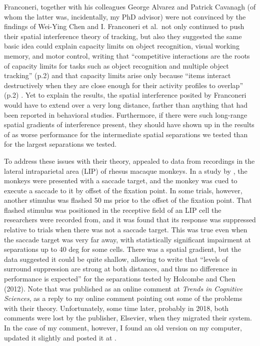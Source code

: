\documentclass[
]{book}
\begin{document}
Franconeri, together with his colleagues George Alvarez and Patrick Cavanagh (of whom the latter was, incidentally, my PhD advisor) were not convinced by the findings of Wei-Ying Chen and I. Franconeri et al.~not only continued to push their spatial interference theory of tracking, but also they suggested the same basic idea could explain capacity limits on object recognition, visual working memory, and motor control, writing that ``competitive interactions are the roots of capacity limits for tasks such as object recognition and multiple object tracking'' (p.2) and that capacity limits arise only because ``items interact destructively when they are close enough for their activity profiles to overlap'' (p.2) \citet{franconeriFlexibleCognitiveResources2013}. Yet to explain the \citet{holcombeExhaustingAttentionalTracking2012} results, the spatial interference posited by Franconeri would have to extend over a very long distance, farther than anything that had been reported in behavioral studies. Furthermore, if there were such long-range spatial gradients of interference present, they should have shown up in the results of \citet{holcombeExhaustingAttentionalTracking2012} as worse performance for the intermediate spatial separations we tested than for the largest separations we tested.

To address these issues with their theory, \citet{franconeriResourceTheoryNot2013} appealed to data from recordings in the lateral intraparietal area (LIP) of rhesus macaque monkeys. In a study by \citet{falknerSurroundSuppressionSharpens2010}, the monkeys were presented with a saccade target, and the monkey was cued to execute a saccade to it by offset of the fixation point. In some trials, however, another stimulus was flashed 50 ms prior to the offset of the fixation point. That flashed stimulus was positioned in the receptive field of an LIP cell the researchers were recorded from, and it was found that its response was suppressed relative to trials when there was not a saccade target. This was true even when the saccade target was very far away, with statistically significant impairment at separations up to 40 deg for some cells. There was a spatial gradient, but the data suggested it could be quite shallow, allowing \citet{franconeriResourceTheoryNot2013} to write that ``levels of surround suppression are strong at both distances, and thus no difference in performance is expected'' for the separations tested by Holcombe and Chen (2012). Note that \citet{franconeriResourceTheoryNot2013} was published as an online comment at \emph{Trends in Cognitive Sciences}, as a reply to my online comment pointing out some of the problems with their theory. Unfortunately, some time later, probably in 2018, both comments were lost by the publisher, Elsevier, when they migrated their system. In the case of my comment, however, I found an old version on my computer, updated it slightly and posted it at \citet{holcombeCommentCapacityLimits2019}.
\end{document}
